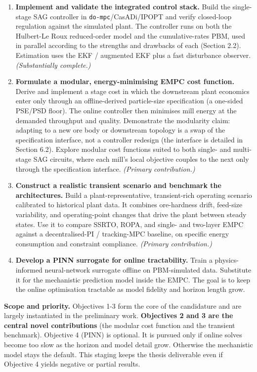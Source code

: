 \documentclass[
  14pt,
]{extarticle}
\begin{document}
\begin{enumerate}
\def\labelenumi{\arabic{enumi}.}
\item
  \textbf{Implement and validate the integrated control stack.} Build
  the single-stage SAG controller in \texttt{do-mpc}/CasADi/IPOPT and
  verify closed-loop regulation against the simulated plant. The
  controller runs on both the Hulbert-Le Roux reduced-order model and
  the cumulative-rates PBM, used in parallel according to the strengths
  and drawbacks of each (Section 2.2). Estimation uses the EKF /
  augmented EKF plus a fast disturbance observer. \emph{(Substantially
  complete.)}
\item
  \textbf{Formulate a modular, energy-minimising EMPC cost function.}
  Derive and implement a stage cost in which the downstream plant
  economics enter only through an offline-derived particle-size
  specification (a one-sided PSE/PSD floor). The online controller then
  minimises mill energy at the demanded throughput and quality.
  Demonstrate the modularity claim: adapting to a new ore body or
  downstream topology is a swap of the specification interface, not a
  controller redesign (the interface is detailed in Section 6.2).
  Explore modular cost functions suited to both single- and multi-stage
  SAG circuits, where each mill's local objective couples to the next
  only through the specification interface. \emph{(Primary
  contribution.)}
\item
  \textbf{Construct a realistic transient scenario and benchmark the
  architectures.} Build a plant-representative, transient-rich operating
  scenario calibrated to historical plant data. It combines ore-hardness
  drift, feed-size variability, and operating-point changes that drive
  the plant between steady states. Use it to compare SSRTO, ROPA, and
  single- and two-layer EMPC against a decentralised-PI / tracking-MPC
  baseline, on specific energy consumption and constraint compliance.
  \emph{(Primary contribution.)}
\item
  \textbf{Develop a PINN surrogate for online tractability.} Train a
  physics-informed neural-network surrogate offline on PBM-simulated
  data. Substitute it for the mechanistic prediction model inside the
  EMPC. The goal is to keep the online optimisation tractable as model
  fidelity and horizon length grow.
\end{enumerate}

\textbf{Scope and priority.} Objectives 1-3 form the core of the
candidature and are largely instantiated in the preliminary work.
\textbf{Objectives 2 and 3 are the central novel contributions} (the
modular cost function and the transient benchmark). Objective 4 (PINN)
is optional. It is pursued only if online solves become too slow as the
horizon and model detail grow. Otherwise the mechanistic model stays the
default. This staging keeps the thesis deliverable even if Objective 4
yields negative or partial results.
\end{document}
